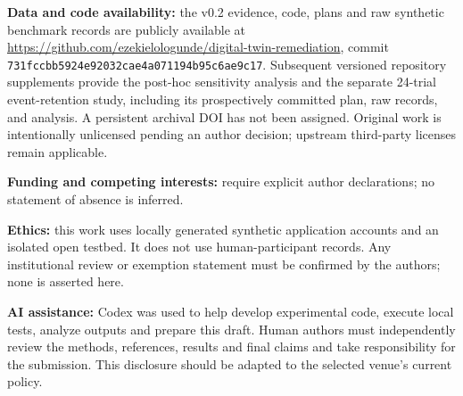 \documentclass[manuscript,review,nonacm]{acmart}
\begin{document}
\textbf{Data and code availability:} the v0.2 evidence, code, plans and raw synthetic benchmark records are publicly available at \url{https://github.com/ezekielologunde/digital-twin-remediation}, commit \texttt{731fccbb5924e92032cae4a071194b95c6ae9c17}. Subsequent versioned repository supplements provide the post-hoc sensitivity analysis and the separate 24-trial event-retention study, including its prospectively committed plan, raw records, and analysis. A persistent archival DOI has not been assigned. Original work is intentionally unlicensed pending an author decision; upstream third-party licenses remain applicable.

\textbf{Funding and competing interests:} require explicit author declarations; no statement of absence is inferred.

\textbf{Ethics:} this work uses locally generated synthetic application accounts and an isolated open testbed. It does not use human-participant records. Any institutional review or exemption statement must be confirmed by the authors; none is asserted here.

\textbf{AI assistance:} Codex was used to help develop experimental code, execute local tests, analyze outputs and prepare this draft. Human authors must independently review the methods, references, results and final claims and take responsibility for the submission. This disclosure should be adapted to the selected venue's current policy.
\end{document}
